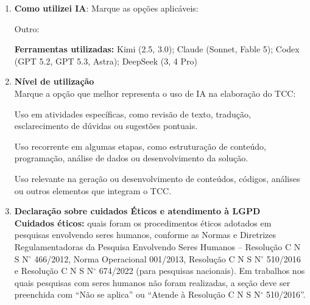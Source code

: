 \begin{enumerate}
\item \textbf{Como utilizei IA}: Marque as opções aplicáveis:

\vspace{0.32cm}
\vspace{0.24cm}
\vspace{0.24cm}
\vspace{0.24cm}
\vspace{0.24cm}
\vspace{0.24cm}
\vspace{0.24cm}
\noindent\checkbox\hspace{0.12cm}Outro: \formline{10.95cm}

\vspace{0.42cm}
\textbf{Ferramentas utilizadas:} Kimi (2.5, 3.0); Claude (Sonnet, Fable 5); Codex (GPT 5.2, GPT 5.3, Astra); DeepSeek (3, 4 Pro)

\vspace{0.48cm}
\formline{15.25cm}

\vspace*{0.45cm}

\item \textbf{Nível de utilização}\\
\noindent Marque a opção que melhor representa o uso de IA na elaboração do TCC:

\vspace{0.38cm}
Uso em atividades específicas, como revisão de texto, tradução, esclarecimento de dúvidas ou sugestões pontuais.

\vspace{0.38cm}
Uso recorrente em algumas etapas, como estruturação de conteúdo, programação, análise de dados ou desenvolvimento da solução.

\vspace{0.38cm}
Uso relevante na geração ou desenvolvimento de conteúdos, códigos, análises ou outros elementos que integram o TCC.

\vspace{0.72cm}
\item \textbf{Declaração sobre cuidados Éticos e atendimento à LGPD}\\
\textbf{Cuidados éticos:} quais foram os procedimentos éticos adotados em pesquisas envolvendo seres humanos, conforme as Normas e Diretrizes Regulamentadoras da Pesquisa Envolvendo Seres Humanos -- Resolução C N S N$^\circ$ 466/2012, Norma Operacional 001/2013, Resolução C N S N$^\circ$ 510/2016 e Resolução C N S N$^\circ$ 674/2022 (para pesquisas nacionais). Em trabalhos nos quais pesquisas com seres humanos não foram realizadas, a seção deve ser preenchida com ``Não se aplica'' ou ``Atende à Resolução C N S N$^\circ$ 510/2016''.


\end{enumerate}
